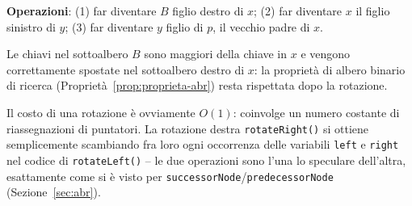 \documentclass[12pt, a4paper]{article}
\begin{document}
\textbf{Operazioni}: (1) far diventare $B$ figlio destro di $x$; (2) far diventare $x$ il figlio sinistro di $y$; (3) far diventare $y$ figlio di $p$, il vecchio padre di $x$.

\begin{tcolorbox}[colback=lightergray!5, colframe=tocsubsec, title=\textbf{Perché Funziona}]
Le chiavi nel sottoalbero $B$ sono maggiori della chiave in $x$ e vengono correttamente spostate nel sottoalbero destro di $x$: la proprietà di albero binario di ricerca (Proprietà~\ref{prop:proprieta-abr}) resta rispettata dopo la rotazione.
\end{tcolorbox}

\begin{tcolorbox}[colback=lightergray!10, colframe=tocsec, title=\textbf{Costo e Simmetria}]
Il costo di una rotazione è ovviamente $O(1)$: coinvolge un numero costante di riassegnazioni di puntatori. La rotazione destra \texttt{rotateRight()} si ottiene semplicemente scambiando fra loro ogni occorrenza delle variabili \texttt{left} e \texttt{right} nel codice di \texttt{rotateLeft()} -- le due operazioni sono l'una lo speculare dell'altra, esattamente come si è visto per \texttt{successorNode}/\texttt{predecessorNode} (Sezione~\ref{sec:abr}).
\end{tcolorbox}
\end{document}
